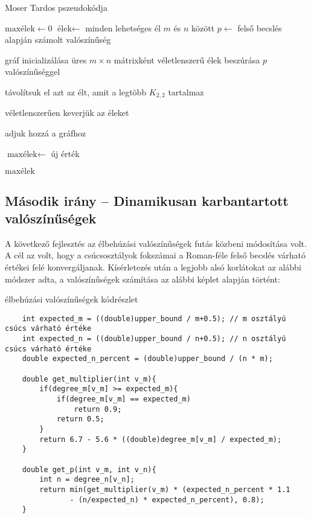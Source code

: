 \documentclass[12pt,a4paper]{article}
\begin{document}
\begin{algorithm}[H]
\caption{Moser Tardos pszeudokódja}
\begin{algorithmic}[1]

    \State $\text{maxélek} \gets 0$
    \State $\text{élek} \gets$ minden lehetséges él $m$ és $n$ között
    \State $p \gets$ felső becslés alapján számolt valószínűség

        \State gráf inicializálása üres $m \times n$ mátrixként
        \State véletlenszerű élek beszúrása $p$ valószínűséggel

            \State távolítsuk el azt az $\text{élt}$, amit a legtöbb $K_{2,2}$ tartalmaz
        \EndWhile

        \State véletlenszerűen keverjük az éleket

                \State adjuk hozzá a gráfhoz
            \EndIf
        \EndFor

            \State $\text{maxélek} \gets$ új érték
        \EndIf
    \EndFor

    \State \Return $\text{maxélek}$
\EndFunction

\end{algorithmic}
\end{algorithm}


\subsection*{Második irány – Dinamikusan karbantartott valószínűségek}

A következő fejlesztés az élbehúzási valószínűségek futás közbeni módosítása volt. A cél az volt, hogy a csúcsosztályok fokszámai a Roman-féle felső becslés várható értékei felé konvergáljanak. Kísérletezés után a legjobb alsó korlátokat az alábbi módszer adta, a valószínűségek számítása az alábbi képlet alapján történt:

\begin{algorithm}[H]
\caption{élbehúzási valószínűségek kódrészlet}
\begin{verbatim} 
    int expected_m = ((double)upper_bound / m+0.5); // m osztályú csúcs várható értéke
    int expected_n = ((double)upper_bound / n+0.5); // n osztályú csúcs várható értéke
    double expected_n_percent = (double)upper_bound / (n * m);
    
    double get_multiplier(int v_m){
        if(degree_m[v_m] >= expected_m){
            if(degree_m[v_m] == expected_m)
                return 0.9;
            return 0.5;
        }
        return 6.7 - 5.6 * ((double)degree_m[v_m] / expected_m);
    }

    double get_p(int v_m, int v_n){
        int n = degree_n[v_n];
        return min(get_multiplier(v_m) * (expected_n_percent * 1.1
               - (n/expected_n) * expected_n_percent), 0.8);
    }
\end{verbatim}    
\end{algorithm}
\end{document}
